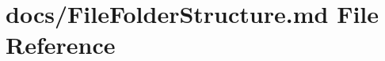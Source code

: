 \hypertarget{FileFolderStructure_8md}{}\section{docs/\+File\+Folder\+Structure.md File Reference}
\label{FileFolderStructure_8md}
